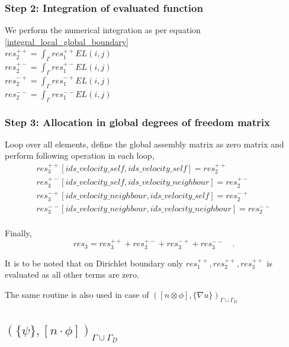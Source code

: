 \documentclass[a4paper,openany]{book}
\begin{document}
\subsubsection{Step 2: Integration of evaluated function}

We perform the numerical integration as per equation \ref{integral_local_global_boundary}
\\ 
$res_2^{++} = \int_{\Gamma} res_1^{++} EL(i,j)$\\
$res_2^{+-} = \int_{\Gamma} res_1^{+-} EL(i,j)$\\
$res_2^{-+} = \int_{\Gamma} res_1^{-+} EL(i,j)$\\
$res_2^{--} = \int_{\Gamma} res_1^{--} EL(i,j)$\\

\subsubsection{Step 3: Allocation in global degrees of freedom matrix}

Loop over all elements, define the global assembly matrix as zero matrix and perform following operation in each loop,
\begin{equation}
\begin{split}
res_3^{++}[ids\_velocity\_self,ids\_velocity\_self] = res_2^{++}\\
res_3^{+-}[ids\_velocity\_self,ids\_velocity\_neighbour] = res_2^{+-}\\
res_3^{-+}[ids\_velocity\_neighbour,ids\_velocity\_self] = res_2^{-+}\\
res_3^{--}[ids\_velocity\_neighbour,ids\_velocity\_neighbour] = res_2^{--}\\
\end{split}
\end{equation}

Finally,
\begin{equation}
res_3 = res_3^{++} + res_3^{+-} + res_3^{-+} + res_3^{--} \quad \textrm{.}
\end{equation}

It is to be noted that on Dirichlet boundary only $res_1^{++}, res_2^{++}, res_3^{++}$ is evaluated as all other terms are zero.

The same routine is also used in case of $([n \otimes \phi],\lbrace \nabla u \rbrace )_{\Gamma \cup \Gamma_D}$

\subsection{$(\lbrace \psi \rbrace, [n \cdot \phi])_{\Gamma \cup \Gamma_D}$}
\end{document}
